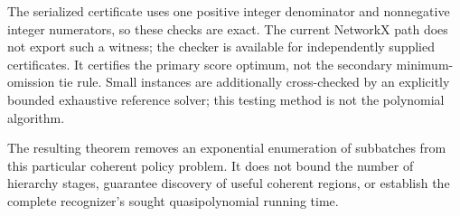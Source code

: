 The serialized certificate uses one positive integer denominator
and nonnegative integer numerators, so these checks are exact.
The current NetworkX path does not export such a witness; the
checker is available for independently supplied certificates.
It certifies the primary score optimum, not the secondary
minimum-omission tie rule. Small instances are additionally
cross-checked by an explicitly bounded exhaustive reference
solver; this testing method is not the polynomial algorithm.

The resulting theorem removes an exponential enumeration of
subbatches from this particular coherent policy problem. It
does not bound the number of hierarchy stages, guarantee
discovery of useful coherent regions, or establish the complete
recognizer's sought quasipolynomial running time.
